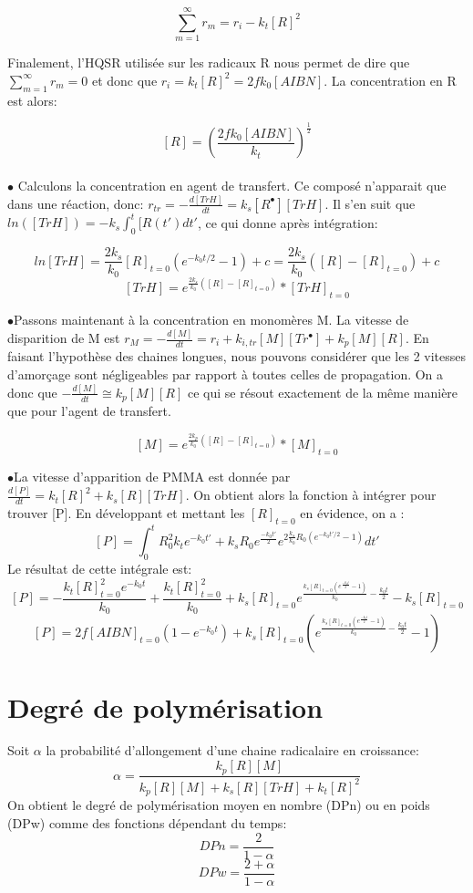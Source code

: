 \documentclass[a4paper,oneside,12pt]{article}
\begin{document}
\begin{equation}
\sum\limits_{m=1}^\infty r_{m}=r_i-k_{t}[R]^2
\end{equation}

Finalement, l'HQSR utilisée sur les radicaux R nous permet de dire que $\sum\limits_{m=1}^\infty r_{m}=0$ et donc que $r_i=k_{t}[R]^2=2fk_{0}[AIBN]$. La concentration en R est alors:

$$[R]=(\frac{2fk_{0}[AIBN]}{k_t})^{\frac{1}{2}}$$\\

$\bullet$ Calculons la concentration en agent de transfert. Ce composé n'apparait que dans une réaction, donc: $r_{tr}=-\frac{d[TrH]}{dt}=k_s[R^{\bullet}][TrH]$. Il s'en suit que $ln([TrH])=-k_s\int_{0}^t [R(t') dt'$, ce qui donne après intégration:

$$ln[TrH]=\frac{2k_{s}}{k_0}[R]_{t=0}(e^{-k_{0}t/2} - 1)+c=\frac{2k_{s}}{k_0}([R]-[R]_{t=0})+c$$
$$[TrH]=e^{\frac{2k_{s}}{k_0}([R]-[R]_{t=0})}*[TrH]_{t=0}$$


$\bullet$Passons maintenant à la concentration en monomères M. La vitesse de disparition de M est $r_M = -\frac{d[M]}{dt}=r_{i}+k_{i,tr}[M][Tr^{\bullet}]+k_{p}[M][R]$. En faisant l'hypothèse des chaines longues, nous pouvons considérer que les 2 vitesses d'amorçage sont négligeables par rapport à toutes celles de propagation. On a donc que $-\frac{d[M]}{dt}\cong k_{p}[M][R]$ ce qui se résout exactement de la même manière que pour l'agent de transfert.

$$[M]=e^{\frac{2k_{p}}{k_0}([R]-[R]_{t=0})}*[M]_{t=0}$$

$\bullet$La vitesse d'apparition de PMMA est donnée par $\frac{d[P]}{dt}=k_{t}[R]^2+k_{s}[R][TrH]$. On obtient alors la fonction à intégrer pour trouver [P]. En développant et mettant les $[R]_{t=0}$ en évidence, on a :
$$[P]=\int_{0}^t R_{0}^{2}k_te^{-k_0t'}+k_sR_0e^{\frac{-k_0t'}{2}}e^{2\frac{k_s}{k_0}R_0(e^{-k_0t'/2}-1)} dt'$$
Le résultat de cette intégrale est:
$$[P]=-\frac{k_t[R]_{t=0}^2e^{-k_0t}}{k_0}+\frac{k_t[R]_{t=0}^2}{k_0}+k_s[R]_{t=0}e^{\frac{k_s[R]_{t=0}(e^{\frac{-k_0t}{2}}-1)}{k_0}-\frac{k_0t}{2}}-k_s[R]_{t=0}$$
$$[P]=2f[AIBN]_{t=0}(1-e^{-k_0t})+k_s[R]_{t=0}(e^{\frac{k_s[R]_{t=0}(e^{\frac{-k_0t}{2}}-1)}{k_0}-\frac{k_0t}{2}}-1)$$

\section{Degré de polymérisation}
Soit $\alpha$ la probabilité d'allongement d'une chaine radicalaire en croissance: 
$$\alpha=\frac{k_p[R][M]}{k_p[R][M]+k_s[R][TrH]+k_t[R]^2}$$
On obtient le degré de polymérisation moyen en nombre (DPn) ou en poids (DPw) comme des fonctions dépendant du temps:
$$DPn=\frac{2}{1-\alpha}$$
$$DPw=\frac{2+\alpha}{1-\alpha}$$
\end{document}
